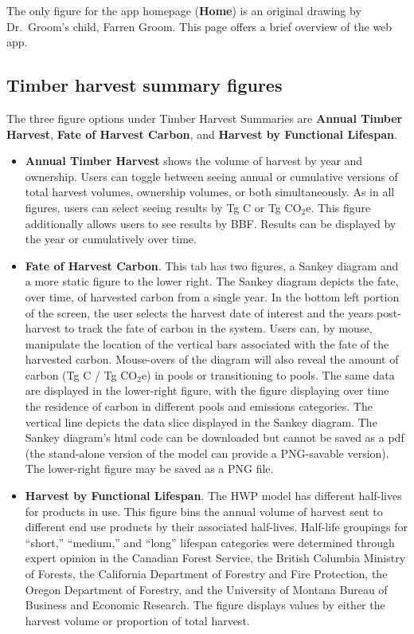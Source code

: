 \documentclass[
  openany]{book}
\begin{document}
The only figure for the app homepage (\textbf{Home}) is an original
drawing by Dr.~Groom's child, Farren Groom. This page offers a brief
overview of the web app.

\hypertarget{app-shiny-timber}{%
\subsection{Timber harvest summary figures}\label{app-shiny-timber}}

The three figure options under Timber Harvest Summaries are
\textbf{Annual Timber Harvest}, \textbf{Fate of Harvest Carbon}, and
\textbf{Harvest by Functional Lifespan}.

\begin{itemize}
\item
  \textbf{Annual Timber Harvest} shows the volume of harvest by year and
  ownership. Users can toggle between seeing annual or cumulative
  versions of total harvest volumes, ownership volumes, or both
  simultaneously. As in all figures, users can select seeing results by
  Tg C or Tg CO\(_2\)e. This figure additionally allows users to see
  results by BBF. Results can be displayed by the year or cumulatively
  over time.
\item
  \textbf{Fate of Harvest Carbon}. This tab has two figures, a Sankey
  diagram and a more static figure to the lower right. The Sankey
  diagram depicts the fate, over time, of harvested carbon from a single
  year. In the bottom left portion of the screen, the user selects the
  harvest date of interest and the years post-harvest to track the fate
  of carbon in the system. Users can, by mouse, manipulate the location
  of the vertical bars associated with the fate of the harvested carbon.
  Mouse-overs of the diagram will also reveal the amount of carbon (Tg C
  / Tg CO\(_2\)e) in pools or transitioning to pools. The same data are
  displayed in the lower-right figure, with the figure displaying over
  time the residence of carbon in different pools and emissions
  categories. The vertical line depicts the data slice displayed in the
  Sankey diagram. The Sankey diagram's html code can be downloaded but
  cannot be saved as a pdf (the stand-alone version of the model can
  provide a PNG-savable version). The lower-right figure may be saved as
  a PNG file.
\item
  \textbf{Harvest by Functional Lifespan}. The HWP model has different
  half-lives for products in use. This figure bins the annual volume of
  harvest sent to different end use products by their associated
  half-lives. Half-life groupings for ``short,'' ``medium,'' and
  ``long'' lifespan categories were determined through expert opinion in
  the Canadian Forest Service, the British Columbia Ministry of Forests,
  the California Department of Forestry and Fire Protection, the Oregon
  Department of Forestry, and the University of Montana Bureau of
  Business and Economic Research. The figure displays values by either
  the harvest volume or proportion of total harvest.
\end{itemize}
\end{document}
